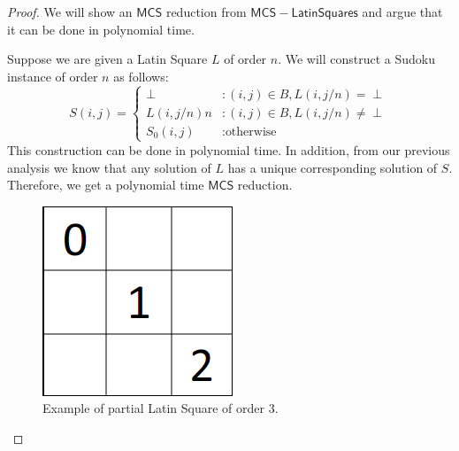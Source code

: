 \documentclass[runningheads,a4paper]{llncs}
\begin{document}
\begin{proof} 

We will show an $\mathsf{MCS}$ reduction from $\mathsf{MCS-Latin Squares}$ and argue that it can be done in polynomial time.

Suppose we are given a Latin Square $L$ of order $n$. We will construct a Sudoku instance of order $n$ as follows:
\begin{displaymath}
S(i,j) = \left\{
\begin{array}{lr}
\perp & : (i,j) \in B, L(i, j/n) = \perp \\
L(i, j/n) n & : (i,j) \in B, L(i, j/n) \neq \perp \\
S_0 (i,j) & : \text{otherwise}
\end{array}
\right.
\end{displaymath}
This construction can be done in polynomial time. In addition, from our previous analysis we know that any solution of $L$ has a unique corresponding solution of $S$. Therefore, we get a polynomial time $\mathsf{MCS}$ reduction.

\begin{figure}[H]
\label{fig:partialLS}
\centering
\includegraphics[scale=0.25]{sudoku-3.png}
\caption{Example of partial Latin Square of order 3.}
\end{figure}


\end{proof}
\end{document}
